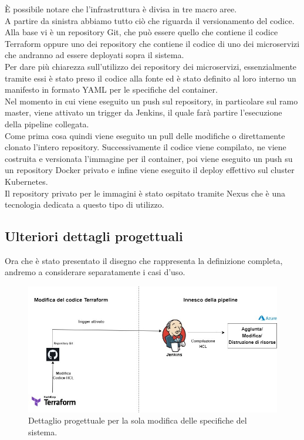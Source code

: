 \documentclass[a4paper,12pt]{report}
\begin{document}
È possibile notare che l'infrastruttura è divisa in tre macro aree.\\
A partire da sinistra abbiamo tutto ciò che riguarda il versionamento del codice. Alla base vi è un repository Git, che può essere quello che contiene il codice Terraform oppure uno dei repository che contiene il codice di uno dei microservizi che andranno ad essere deployati sopra il sistema.\\
Per dare più chiarezza sull'utilizzo dei repository dei microservizi, essenzialmente tramite essi è stato preso il codice alla fonte ed è stato definito al loro interno un manifesto in formato YAML per le specifiche del container.\\
Nel momento in cui viene eseguito un push sul repository, in particolare sul ramo master, viene attivato un trigger da Jenkins, il quale farà partire l'esecuzione della pipeline collegata.\\
Come prima cosa quindi viene eseguito un pull delle modifiche o direttamente clonato l'intero repository. Successivamente il codice viene compilato, ne viene costruita e versionata l'immagine per il container, poi viene eseguito un push su un repository Docker privato e infine viene eseguito il deploy effettivo sul cluster Kubernetes.\\
Il repository privato per le immagini è stato ospitato tramite Nexus che è una tecnologia dedicata a questo tipo di utilizzo.
\subsection{Ulteriori dettagli progettuali}
Ora che è stato presentato il disegno che rappresenta la definizione completa, andremo a considerare separatamente i casi d'uso.

\begin{figure}[h]
	\includegraphics[width=1.0\textwidth]{modifica_terraform}
    \caption{Dettaglio progettuale per la sola modifica delle specifiche del sistema.}
    \label{fig:modifica_terraform}
\end{figure} 
\end{document}
